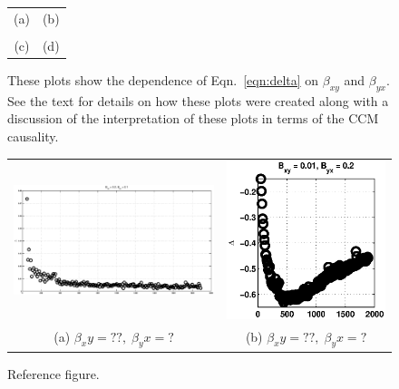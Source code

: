 \documentclass[a4paper,11pt]{article}
\begin{document}
\begin{figure}[ht]
\begin{tabular}{cc}
(a) & (b) \\[6pt]
 & \\
(c) & (d) \\[6pt]
\end{tabular}
\caption{These plots show the dependence of Eqn.\ \ref{eqn:delta} on $\beta_{xy}$ and $\beta_{yx}$.  See the text for details on how these plots were created along with a discussion of the interpretation of these plots in terms of the CCM causality.}
\end{figure}
\begin{figure}[ht]
\label{fig:}
\begin{tabular}{cc}
\includegraphics[scale=0.9]{RefFigureA.eps} & \includegraphics[scale=0.9]{RefFigureB.eps}\\
(a) $\beta_xy = ??,\;\beta_yx=?$ & (b) $\beta_xy = ??,\;\beta_yx=?$\\[6pt]
\end{tabular}
\caption{Reference figure.}
\end{figure}
\end{document}
